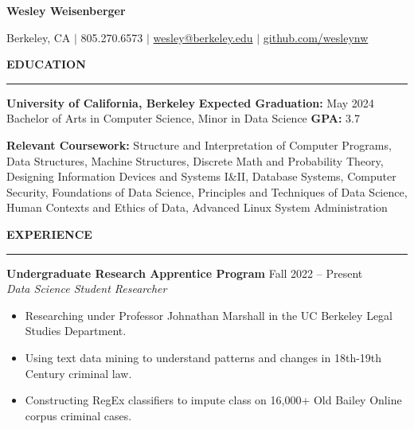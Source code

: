 \documentclass{article}
\begin{document}
    \newcommand{\header}[1]{ 
        \vspace{4mm}
        {\large \noindent \textbf{#1}}
        \vspace{1.5mm}
        \hrule
        \vspace{3mm}
    }

    {\huge \textbf{Wesley Weisenberger}}
    
    \vspace{1.5mm}

    {\Large Berkeley, CA  $\mid$ 805.270.6573 $\mid$ 
    \href{mailto:wesley@berkeley.edu}{wesley@berkeley.edu}
    $\mid$ 
    \href{https://github.com/wesleynw}{github.com/wesleynw}}

    \header{EDUCATION}

        \textbf{University of California, Berkeley} 
        \hfill 
        \textbf{Expected Graduation:} May 2024 \\
        Bachelor of Arts in Computer Science, Minor in Data Science \hfill \textbf{GPA:} 3.7

    \vspace{2.5mm}

    \textbf{Relevant Coursework:}
        Structure and Interpretation of Computer Programs, 
        Data Structures,
        Machine Structures,
        Discrete Math and Probability Theory, 
        Designing Information Devices and Systems I\&II,
        Database Systems,
        Computer Security,
        Foundations of Data Science,
        Principles and Techniques of Data Science, \\
        Human Contexts and Ethics of Data,
        Advanced Linux System Administration
        
    \header{EXPERIENCE}

    \textbf{Undergraduate Research Apprentice Program} \hfill Fall 2022 -- Present
    \\ \textit{Data Science Student Researcher}
    \begin{itemize}
        \item Researching under Professor Johnathan Marshall in the UC Berkeley Legal Studies Department.
        \item Using text data mining to understand patterns and changes in 18th-19th Century criminal law.
        \item Constructing RegEx classifiers to impute class on 16,000+ Old Bailey Online corpus criminal cases.
    \end{itemize}

    \vspace{1mm}
\end{document}
